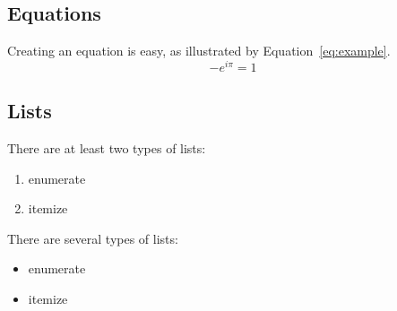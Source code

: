 \documentclass[11pt]{article}
\begin{document}
\subsection{Equations}

Creating an equation is easy, as illustrated by Equation~\ref{eq:example}.
\begin{equation}
  -e^{i \pi} = 1
  \label{eq:example}
\end{equation}

\subsection{Lists}

There are at least two types of lists:
\begin{enumerate}
\item enumerate
\item itemize
\end{enumerate}

There are several types of lists:
\begin{itemize}
\item enumerate
\item itemize
\end{itemize}
\end{document}
